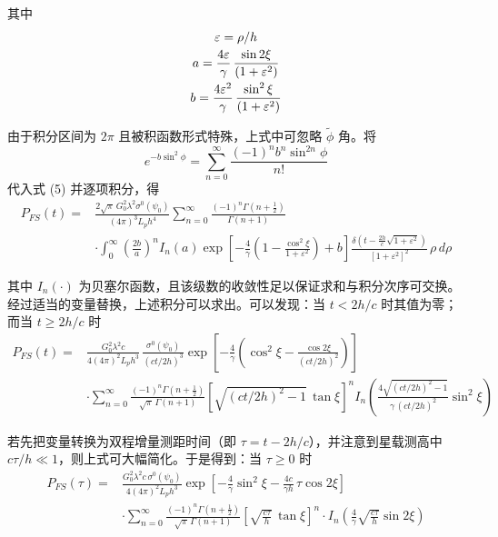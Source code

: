 其中
\[
\begingroup
\setlength{\jot}{0pt}
\begin{gathered}
\varepsilon = \rho/h \\[2pt]
a = \frac{4\varepsilon}{\gamma}\,\frac{\sin 2\xi}{\left(1 + \varepsilon^{2}\right)} \\[2pt]
b = \frac{4\varepsilon^{2}}{\gamma}\,\frac{\sin^{2}\xi}{\left(1 + \varepsilon^{2}\right)}
\end{gathered}
\endgroup
\]

由于积分区间为 $2\pi$ 且被积函数形式特殊，上式中可忽略 $\widetilde{\phi}$ 角。将
\[
e^{-b\sin^{2}\phi} = \sum_{n=0}^{\infty}\frac{(-1)^{n}b^{n}\sin^{2n}\phi}{n!}
\]
代入式 (5) 并逐项积分，得
\[
\begin{aligned}
P_{FS}(t) ={} & \frac{2\sqrt{\pi}\,G_{0}^{2}\lambda^{2}\sigma^{0}(\psi_{0})}{(4\pi)^{3}L_{p}h^{4}}\sum_{n=0}^{\infty}\frac{(-1)^{n}\Gamma\!\left(n + \tfrac{1}{2}\right)}{\Gamma(n+1)} \\
& \cdot \int_{0}^{\infty}\left(\frac{2b}{a}\right)^{n} I_{n}(a)\exp\left[-\frac{4}{\gamma}\left(1 - \frac{\cos^{2}\xi}{1 + \varepsilon^{2}}\right) + b\right]\frac{\delta\!\left(t - \frac{2h}{c}\sqrt{1 + \varepsilon^{2}}\right)}{\left[1 + \varepsilon^{2}\right]^{2}}\,\rho\,d\rho
\end{aligned}
\tag{6}
\]

其中 $I_{n}(\cdot)$ 为贝塞尔函数，且该级数的收敛性足以保证求和与积分次序可交换。经过适当的变量替换，上述积分可以求出。可以发现：当 $t < 2h/c$ 时其值为零；而当 $t \geq 2h/c$ 时
\[
\begin{aligned}
P_{FS}(t) ={} & \frac{G_{0}^{2}\lambda^{2}c}{4(4\pi)^{2}L_{p}h^{3}}\,\frac{\sigma^{0}(\psi_{0})}{(ct/2h)^{3}}\exp\left[-\frac{4}{\gamma}\left(\cos^{2}\xi - \frac{\cos 2\xi}{(ct/2h)^{2}}\right)\right] \\
& \cdot \sum_{n=0}^{\infty}\frac{(-1)^{n}\Gamma\!\left(n + \tfrac{1}{2}\right)}{\sqrt{\pi}\,\Gamma(n+1)}\left[\sqrt{(ct/2h)^{2} - 1}\,\tan\xi\right]^{n} I_{n}\!\left(\frac{4\sqrt{(ct/2h)^{2} - 1}}{\gamma\,(ct/2h)^{2}}\sin^{2}\xi\right)
\end{aligned}
\]

若先把变量转换为双程增量测距时间（即 $\tau = t - 2h/c$），并注意到星载测高中 $c\tau/h \ll 1$，则上式可大幅简化。于是得到：当 $\tau \geq 0$ 时
\[
\begin{aligned}
P_{FS}(\tau) ={} & \frac{G_{0}^{2}\lambda^{2}c\,\sigma^{0}(\psi_{0})}{4(4\pi)^{2}L_{p}h^{3}}\exp\left[-\frac{4}{\gamma}\sin^{2}\xi - \frac{4c}{\gamma h}\,\tau\cos 2\xi\right] \\
& \cdot \sum_{n=0}^{\infty}\frac{(-1)^{n}\Gamma\!\left(n + \tfrac{1}{2}\right)}{\sqrt{\pi}\,\Gamma(n+1)}\left[\sqrt{\frac{c\tau}{h}}\,\tan\xi\right]^{n} \cdot I_{n}\!\left(\frac{4}{\gamma}\sqrt{\frac{c\tau}{h}}\sin 2\xi\right)
\end{aligned}
\tag{7}
\]

